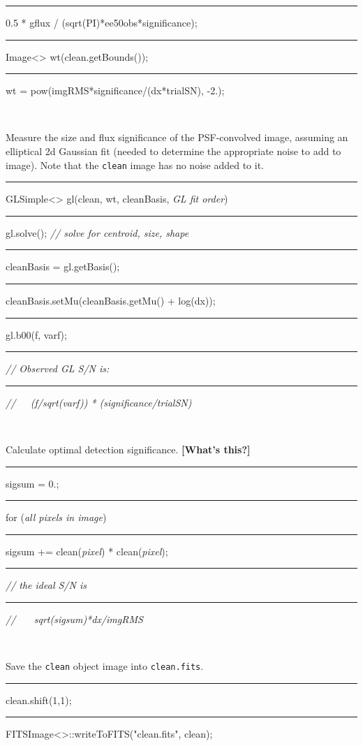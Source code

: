 \documentclass[useAMS,usenatbib,usegraphicx]{mn2e}
\begin{document}
\begin{enumerate}
\begin{boxit}
{  \rule{0.2in}{0in} 0.5 * gflux / (sqrt(PI)*ee50obs*significance); \\
  \rule{0.1in}{0in} Image<> wt(clean.getBounds()); \\
  \rule{0.1in}{0in} wt = pow(imgRMS*significance/(dx*trialSN), -2.);} \\ 
\end{boxit}
Measure the size and flux significance of the PSF-convolved image, assuming an elliptical 
2d Gaussian fit (needed to determine the appropriate noise to add to image).  
Note that the {\tt clean} image has no noise added to it. \\
\begin{boxit}
  {\tt \rule{0.1in}{0in} GLSimple<> gl(clean, wt, cleanBasis, {\it GL fit order}) \\
  \rule{0.1in}{0in} gl.solve();  {\it // solve for centroid, size, shape}  \\
  \rule{0.1in}{0in} cleanBasis = gl.getBasis(); \\
  \rule{0.1in}{0in} cleanBasis.setMu(cleanBasis.getMu() + log(dx)); \\
  \rule{0.1in}{0in} gl.b00(f, varf);  \\
  \rule{0.1in}{0in} {\it // Observed GL S/N is:} \\
  \rule{0.1in}{0in} {\it //\ \ \ (f/sqrt(varf)) * (significance/trialSN) }} \\
\end{boxit}
Calculate optimal detection significance. {\bf [What's this?]}\\
\begin{boxit}
  {\tt \rule{0.1in}{0in} sigsum = 0.; \\
  \rule{0.1in}{0in} for ({\it all pixels in image})\\
  \rule{0.2in}{0in}   sigsum += clean({\it pixel}) * clean({\it pixel});\\
  \rule{0.1in}{0in} {\it // the ideal S/N is }\\
  \rule{0.1in}{0in} {\it // \ \ \ sqrt(sigsum)*dx/imgRMS }} \\
\end{boxit}
Save the {\tt clean} object image into {\tt clean.fits}. \\
\begin{boxit}
  {\tt \rule{0.1in}{0in} clean.shift(1,1); \\
  \rule{0.1in}{0in} FITSImage<>::writeToFITS("clean.fits", clean); } \\
\end{boxit}


\end{enumerate}
\end{document}
